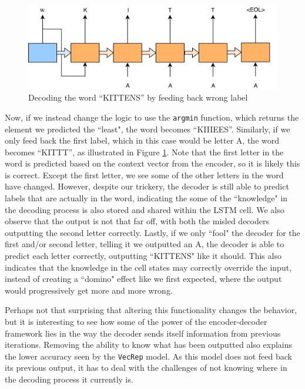 \begin{figure}[!ht]
    \centering
    \includegraphics[width=1\textwidth]{fig/results/kittens_wrong.png}
    \caption{Decoding the word ``KITTENS'' by feeding back wrong label}
    \label{fig:kittens_wrong}
\end{figure}

Now, if we instead change the logic to use the {\tt argmin} function, which returns the element we predicted the ``least", the word becomes ``KIIIEES''. Similarly, if we only feed back the first label, which in this case would be letter A, the word becomes ``KITTT'', as illustrated in Figure \ref{fig:kittens_wrong}. Note that the first letter in the word is predicted based on the context vector from the encoder, so it is likely this is correct. Except the first letter, we see some of the other letters in the word have changed. However, despite our trickery, the decoder is still able to predict labels that are actually in the word, indicating the some of the ``knowledge" in the decoding process is also stored and shared within the LSTM cell. We also observe that the output is not that far off, with both the misled decoders outputting the second letter correctly. Lastly, if we only ``fool" the decoder for the first and/or second letter, telling it we outputted an A, the decoder is able to predict each letter correctly, outputting ``KITTENS" like it should. This also indicates that the knowledge in the cell states may correctly override the input, instead of creating a ``domino" effect like we first expected, where the output would progressively get more and more wrong.

Perhaps not that surprising that altering this functionality changes the behavior, but it is interesting to see how some of the power of the encoder-decoder framework lies in the way the decoder sends itself information from previous iterations. Removing the ability to know what has been outputted also explains the lower accuracy seen by the {\tt VecRep} model. As this model does not feed back its previous output, it has to deal with the challenges of not knowing where in the decoding process it currently is.

